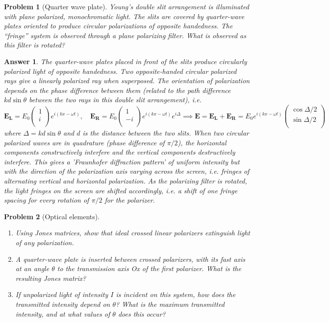 \documentclass[a4paper]{article}
\newtheorem{ans}{Answer}[section]
\theoremstyle{new}
\newtheorem{qns}{Problem}[section]
\begin{document}
\begin{qns}[Quarter wave plate]
Young’s double slit arrangement is illuminated with plane polarized, monochromatic light. The slits are covered by quarter-wave plates oriented to produce circular polarizations of opposite handedness. The “fringe” system is observed through a plane polarizing filter. What is observed as this filter is rotated?
\end{qns}
\begin{ans}
The quarter-wave plates placed in front of the slits produce circularly polarized light of opposite handedness. Two opposite-handed circular polarized rays give a linearly polarized ray when superposed. The orientation of polarization depends on the phase difference between them (related to the path difference $kd\sin\theta$ between the two rays in this double slit arrangement), i.e.
$$\mathbf{E_L}=E_0\begin{pmatrix}1\\i\\\end{pmatrix}e^{i(kx-\omega t)},\quad\mathbf{E_R}=E_0\begin{pmatrix}1\\-i\\\end{pmatrix}e^{i(kx-\omega t)}e^{i\Delta }\implies\mathbf{E}=\mathbf{E_L}+\mathbf{E_R}=E_0e^{i(kx-\omega t)}\begin{pmatrix}\cos\Delta /2\\\sin \Delta/2\\\end{pmatrix}$$
where $\Delta=kd\sin\theta$ and $d$ is the distance between the two slits. When two circular polarized waves are in quadrature (phase difference of $\pi/2$), the horizontal components constructively interfere and the vertical components destructively interfere. This gives a 'Fraunhofer diffraction pattern' of uniform intensity but with the direction of the polarization axis varying across the screen, i.e. fringes of alternating vertical and horizontal polarization. As the polarizing filter is rotated, the light fringes on the screen are shifted accordingly, i.e. a shift of one fringe spacing for every rotation of $\pi/2$ for the polarizer.
\end{ans}
\newpage
\begin{qns}[Optical elements]\leavevmode
\begin{enumerate}[label=(\alph*)]
\item Using Jones matrices, show that ideal crossed linear polarizers extinguish light of any polarization.
\item A quarter-wave plate is inserted between crossed polarizers, with its fast axis at an angle $\theta$ to the transmission axis Ox of the first polarizer. What is the resulting Jones matrix?
\item If unpolarized light of intensity $I$ is incident on this system, how does the transmitted intensity depend on $\theta$? What is the maximum transmitted intensity, and at what values of $\theta$ does this occur?
\end{enumerate}
\end{qns}
\end{document}
